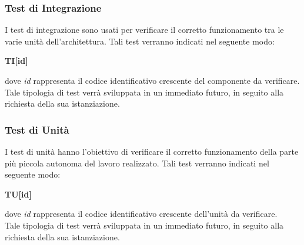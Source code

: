 \subsubsection{Test di Integrazione}
I test di integrazione sono usati per verificare il corretto funzionamento tra le
varie unità dell'architettura. Tali test verranno indicati nel seguente modo:\\
	\centerline{\textbf{TI[id]}}
dove \textit{id} rappresenta il codice identificativo crescente del componente da
verificare.\\
Tale tipologia di test verrà sviluppata in un immediato futuro, in seguito alla richiesta della sua istanziazione.

\subsubsection{Test di Unità}
I test di unità hanno l'obiettivo di verificare il corretto funzionamento della 
parte più piccola autonoma del lavoro realizzato. Tali test verranno indicati nel
seguente modo:\\
	\centerline{\textbf{TU[id]}}
dove \textit{id} rappresenta il codice identificativo crescente dell'unità da verificare.\\
Tale tipologia di test verrà sviluppata in un immediato futuro, in seguito alla richiesta della sua istanziazione.
